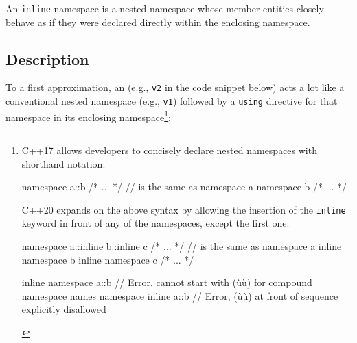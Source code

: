 
\setcounter{table}{0}
\setcounter{footnote}{0}
\setcounter{lstlisting}{0}


An \lstinline!inline! namespace is a nested namespace whose member entities
closely behave as if they were declared directly within the enclosing
namespace.

\subsection[Description]{Description}\label{description-inlinenamespace}

To a first approximation, an 
(e.g., \lstinline!v2! in the code snippet below) acts a lot like a
conventional nested namespace (e.g., \lstinline!v1!) followed by a
\lstinline!using! directive for that namespace in its enclosing namespace{\cprotect\footnote{C++17 allows developers to concisely declare nested
namespaces with shorthand notation:
\begin{emcppslisting}[language=C++, style=footcode]
namespace a::b { /* ... */ }
// is the same as
namespace a { namespace b { /* ... */ } }
\end{emcppslisting}
C++20 expands on the above syntax by allowing the insertion of the
\lstinline!inline! keyword in front of any of the namespaces, except the
first one:
\begin{emcppslisting}[language=C++, style=footcode]
namespace a::inline b::inline c { /* ... */ }
// is the same as
namespace a { inline namespace b { inline namespace c { /* ... */ } } }

inline namespace a::b { }  // Error, cannot start with (ù{}ù) for compound namespace names
namespace inline a::b { }  // Error, (ù{}ù) at front of sequence explicitly disallowed
\end{emcppslisting}
      }}:

